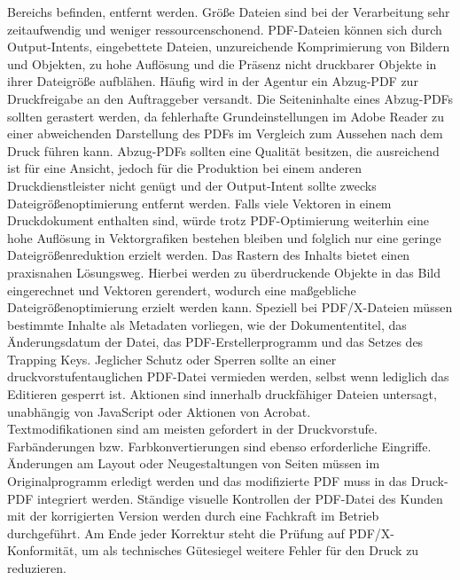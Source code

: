 Bereichs befinden, entfernt werden. Größe Dateien sind bei der Verarbeitung sehr zeitaufwendig und weniger ressourcenschonend. PDF-Dateien können sich durch Output-Intents, eingebettete Dateien, unzureichende Komprimierung von Bildern und Objekten, zu hohe Auflösung und die Präsenz nicht druckbarer Objekte in ihrer Dateigröße aufblähen. Häufig wird in der Agentur ein Abzug-PDF zur Druckfreigabe an den Auftraggeber versandt. Die Seiteninhalte eines Abzug-PDFs sollten gerastert werden, da fehlerhafte Grundeinstellungen im Adobe Reader zu einer abweichenden Darstellung des PDFs im Vergleich zum Aussehen nach dem Druck führen kann. Abzug-PDFs sollten eine Qualität besitzen, die ausreichend ist für eine Ansicht, jedoch für die Produktion bei einem anderen Druckdienstleister nicht genügt und der Output-Intent sollte zwecks Dateigrößenoptimierung entfernt werden. Falls viele Vektoren in einem Druckdokument enthalten sind, würde trotz PDF-Optimierung weiterhin eine hohe Auflösung in Vektorgrafiken bestehen bleiben und folglich nur eine geringe Dateigrößenreduktion erzielt werden. Das Rastern des Inhalts bietet einen praxisnahen Lösungsweg. Hierbei werden zu überdruckende Objekte in das Bild eingerechnet und Vektoren gerendert, wodurch eine maßgebliche Dateigrößenoptimierung erzielt werden kann. Speziell bei PDF/X-Dateien müssen bestimmte Inhalte als Metadaten vorliegen, wie der Dokumententitel, das Änderungsdatum der Datei, das PDF-Erstellerprogramm und das Setzes des Trapping Keys. Jeglicher Schutz oder Sperren sollte an einer druckvorstufentauglichen PDF-Datei vermieden werden, selbst wenn lediglich das Editieren gesperrt ist. Aktionen sind innerhalb druckfähiger Dateien untersagt, unabhängig von JavaScript oder Aktionen von Acrobat. \\
Textmodifikationen sind am meisten gefordert in der Druckvorstufe. Farbänderungen bzw. Farbkonvertierungen sind ebenso erforderliche Eingriffe. Änderungen am Layout oder Neugestaltungen von Seiten müssen im Originalprogramm erledigt werden und das modifizierte PDF muss in das Druck-PDF integriert werden. Ständige visuelle Kontrollen der PDF-Datei des Kunden mit der korrigierten Version werden durch eine Fachkraft im Betrieb durchgeführt. Am Ende jeder Korrektur steht die Prüfung auf PDF/X-Konformität, um als technisches Gütesiegel weitere Fehler für den Druck zu reduzieren. \\
